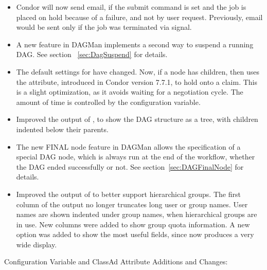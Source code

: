 \begin{itemize}
\item Condor will now send email,
if the submit command  is set and
the job is placed on hold because of a failure, and not by user request.
Previously, email would be sent only if the job was terminated via signal.

\item A new feature in DAGMan implements a second way to suspend a running DAG.
See section ~\ref{sec:DagSuspend} for details.

\item The default settings for  have changed.
Now, if a node has children, then  uses the
 attribute, 
introduced in Condor version 7.7.1, to hold onto a claim.
This is a slight optimization, 
as it avoids waiting for a negotiation cycle.
The amount of time is controlled by the
 configuration variable.

\item Improved the output of  ,
to show the DAG structure as a tree,
with children indented below their parents.

\item The new FINAL node feature in DAGMan allows the specification
of a special DAG node, 
which is always run at the end of the workflow,
whether the DAG ended successfully or not.
See section~\ref{sec:DAGFinalNode} for details.

\item Improved the output of  to better support hierarchical
groups. 
The first column of the output no longer truncates long user or group names.
User names are shown indented under group names,
when hierarchical groups are in use.
New columns were added to show group quota information.
A new  option was added to show 
the most useful fields,
since  now produces a very wide display.

\end{itemize}

\noindent Configuration Variable and ClassAd Attribute Additions and Changes:

